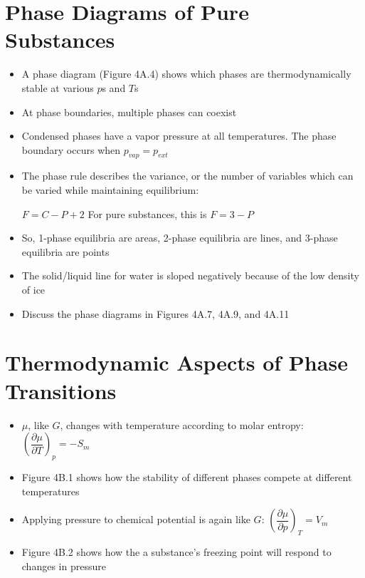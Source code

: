 \documentclass[12pt, openany, letterpaper]{memoir}
\begin{document}
\section{Phase Diagrams of Pure Substances}
\begin{itemize}
	\item A phase diagram (Figure 4A.4) shows which phases are thermodynamically stable at various $p$s and $T$s
	\item At phase boundaries, multiple phases can coexist
	\item Condensed phases have a vapor pressure at all temperatures. The phase boundary occurs when $p_{vap}=p_{ext}$
	\item The phase rule describes the variance, or the number of variables which can be varied while maintaining equilibrium:
	
	$F=C-P+2$ \hspace{3em} For pure substances, this is $F=3-P$
	\item So, 1-phase equilibria are areas, 2-phase equilibria are lines, and 3-phase equilibria are points
	\item The solid/liquid line for water is sloped negatively because of the low density of ice
	\item Discuss the phase diagrams in Figures 4A.7, 4A.9, and 4A.11
\end{itemize}

\section{Thermodynamic Aspects of Phase Transitions}
\begin{itemize}
	\item $\mu$, like $G$, changes with temperature according to molar entropy: $\left(\dfrac{\partial \mu}{\partial T}\right)_p=-S_m$
	\item Figure 4B.1 shows how the stability of different phases compete at different temperatures
	\item Applying pressure to chemical potential is again like $G$: $\left(\dfrac{\partial \mu}{\partial p}\right)_T=V_m$
	\item Figure 4B.2 shows how the a substance's freezing point will respond to changes in pressure
\end{itemize}
\end{document}
